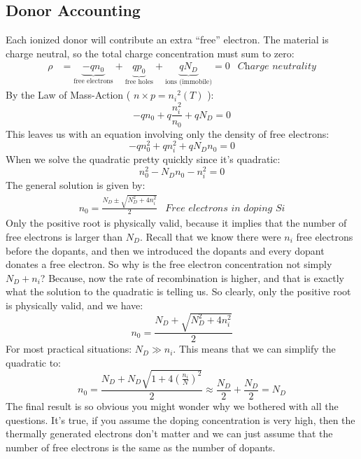 \subsection{Donor Accounting}
Each ionized donor will contribute an extra “free” electron.  The material is charge neutral, so the total charge concentration must sum to zero:
    \begin{align}
        \rho &= \underbrace{- q{n_0}}_{\text{free electrons}}
        + \underbrace{q{p_0}}_{\text{free holes}}
        + \underbrace{q{N_D}}_{\text{ions (immobile)}} = 0 &\textit{Charge neutrality}
    \end{align}
By the Law of Mass-Action \big( $n \times p = {n_i}^2(T)$ \big):
    \begin{equation*}
        - q{n_0} + q\frac{{n_i^2}}{{{n_0}}} + q{N_D} = 0
    \end{equation*}
This leaves us with an equation involving only the density of free electrons:
    \begin{equation*}
        - qn_0^2 + qn_i^2 + q{N_D}{n_0} = 0
    \end{equation*}
When we solve the quadratic pretty quickly since it’s quadratic:
    \begin{equation*}
        n_0^2 - {N_D}{n_0} - n_i^2 = 0
    \end{equation*}
The general solution is given by:
    \begin{align}
        {n_0} = \frac{{{N_D} \pm \sqrt {N_D^2 + 4n_i^2} }}{2} &\textit{Free electrons in doping Si}
    \end{align}
Only the positive root is physically valid, because it implies that the number of free electrons is larger than $N_D$.  Recall that we know there were $n_i$ free electrons before the dopants, and then we introduced the dopants and every dopant donates a free electron.  So why is the free electron concentration not simply $N_D + n_i$?  Because, now the rate of recombination is higher, and that is exactly what the solution to the quadratic is telling us.  So clearly, only the positive root is physically valid, and we have:
    \begin{equation}
        {n_0} = \frac{{{N_D} + \sqrt {N_D^2 + 4n_i^2} }}{2}
    \end{equation}
For most practical situations:  ${N_D} \gg {n_i}$.  This means that we can simplify the quadratic to: 
    \begin{equation}
        {n_0} = \frac{{{N_D} + {N_D}\sqrt {1 + 4{{\left( {\frac{{{n_i}}}{N}} \right)}^2}} }}{2} \approx \frac{{{N_D}}}{2} + \frac{{{N_D}}}{2} = {N_D}
    \end{equation}
The final result is so obvious you might wonder why we bothered with all the questions.  It’s true, if you assume the doping concentration is very high, then the thermally generated electrons don’t matter and we can just assume that the number of free electrons is the same as the number of dopants.
\newpage
